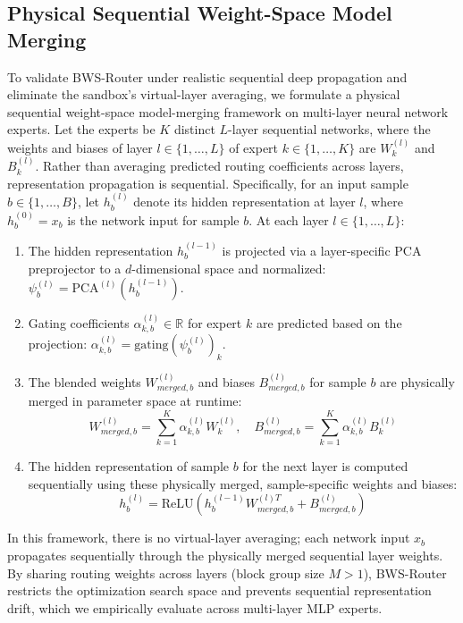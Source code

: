 \subsection{Physical Sequential Weight-Space Model Merging}
To validate BWS-Router under realistic sequential deep propagation and eliminate the sandbox's virtual-layer averaging, we formulate a physical sequential weight-space model-merging framework on multi-layer neural network experts. Let the experts be $K$ distinct $L$-layer sequential networks, where the weights and biases of layer $l \in \{1, \dots, L\}$ of expert $k \in \{1, \dots, K\}$ are $W_k^{(l)}$ and $B_k^{(l)}$. Rather than averaging predicted routing coefficients across layers, representation propagation is sequential. Specifically, for an input sample $b \in \{1, \dots, B\}$, let $h_b^{(l)}$ denote its hidden representation at layer $l$, where $h_b^{(0)} = x_b$ is the network input for sample $b$. At each layer $l \in \{1, \dots, L\}$:
\begin{enumerate}
    \item The hidden representation $h_b^{(l-1)}$ is projected via a layer-specific PCA preprojector to a $d$-dimensional space and normalized: $\psi_b^{(l)} = \text{PCA}^{(l)}(h_b^{(l-1)})$.
    \item Gating coefficients $\alpha_{k, b}^{(l)} \in \mathbb{R}$ for expert $k$ are predicted based on the projection: $\alpha_{k, b}^{(l)} = \text{gating}(\psi_b^{(l)})_k$.
    \item The blended weights $W_{merged, b}^{(l)}$ and biases $B_{merged, b}^{(l)}$ for sample $b$ are physically merged in parameter space at runtime:
    \begin{equation}
        W_{merged, b}^{(l)} = \sum_{k=1}^K \alpha_{k, b}^{(l)} W_k^{(l)}, \quad B_{merged, b}^{(l)} = \sum_{k=1}^K \alpha_{k, b}^{(l)} B_k^{(l)}
    \end{equation}
    \item The hidden representation of sample $b$ for the next layer is computed sequentially using these physically merged, sample-specific weights and biases:
    \begin{equation}
        h_b^{(l)} = \text{ReLU}\left( h_b^{(l-1)} W_{merged, b}^{(l) T} + B_{merged, b}^{(l)} \right)
    \end{equation}
\end{enumerate}
In this framework, there is no virtual-layer averaging; each network input $x_b$ propagates sequentially through the physically merged sequential layer weights. By sharing routing weights across layers (block group size $M > 1$), BWS-Router restricts the optimization search space and prevents sequential representation drift, which we empirically evaluate across multi-layer MLP experts.

